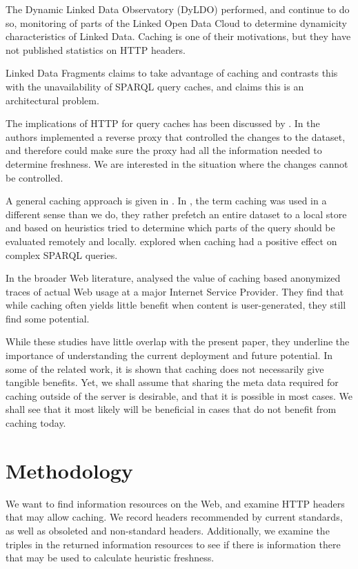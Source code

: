 \documentclass{llncs}
\begin{document}
The \cite{dyldo2} Dynamic Linked Data Observatory (DyLDO) performed,
and continue to do so, monitoring of parts of the Linked Open Data
Cloud to determine dynamicity characteristics of Linked Data. Caching
is one of their motivations, but they have not published statistics on
HTTP headers.

Linked Data Fragments \cite{ldf1} claims to take advantage of caching
and contrasts this with the unavailability of SPARQL query caches, and
claims this is an architectural problem.

The implications of HTTP for query caches has been discussed by
\cite{kaseicache}. In \cite{sparqlproxy} the authors implemented a
reverse proxy that controlled the changes to the dataset, and
therefore could make sure the proxy had all the information needed to
determine freshness. We are interested in the situation where the
changes cannot be controlled.

A general caching approach is given in \cite{yang2011caching}.  In
\cite{umbrich2012hybrid}, the term caching was used in a different
sense than we do, they rather prefetch an entire dataset to a local
store and based on heuristics tried to determine which parts of the
query should be evaluated remotely and locally. \cite{lampo2011cache}
explored when caching had a positive effect on complex SPARQL
queries.

In the broader Web literature, \cite{ager2010revisiting} analysed the
value of caching based anonymized traces of actual Web usage at a
major Internet Service Provider. They find that while caching often
yields little benefit when content is user-generated, they still find
some potential.

While these studies have little overlap with the present paper, they
underline the importance of understanding the current deployment and
future potential. In some of the related work, it is shown that
caching does not necessarily give tangible benefits. Yet, we shall
assume that sharing the meta data required for caching outside of the
server is desirable, and that it is possible in most cases. We shall
see that it most likely will be beneficial in cases that do not
benefit from caching today.

\section{Methodology}

We want to find information resources on the Web, and examine HTTP
headers that may allow caching. We record headers recommended by
current standards, as well as obsoleted and non-standard
headers. Additionally, we examine the triples in the returned
information resources to see if there is information there that may be
used to calculate heuristic freshness.
\end{document}
